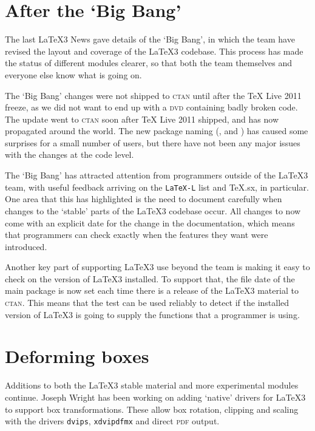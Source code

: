 \documentclass{ltnews}
\begin{document}
\maketitle

\section{After the `Big Bang'}

The last \LaTeX3 News gave details of the `Big Bang', in which the team have
revised the layout and coverage of the \LaTeX3 codebase. This process has
made the status of different modules clearer, so that both the team themselves
and everyone else know what is going on.

The `Big Bang' changes were not shipped to \textsc{ctan} until after the \TeX{}
Live 2011 freeze, as we did not want to end up with a \textsc{dvd} containing
badly broken code. The update went to \textsc{ctan} soon after \TeX{} Live 2011
shipped, and has now propagated around the world. The new package naming
(,  and ) has caused some
surprises for a small number of users, but there have not been any major
issues with the changes at the code level.

The `Big Bang' has attracted attention from programmers outside of the
\LaTeX3 team, with useful feedback arriving on the
\texttt{LaTeX-L} list and TeX.sx, in particular. One area that this has
highlighted is the need to document carefully when changes to the `stable'
parts of the \LaTeX3 codebase occur. All changes to  now
come with an explicit date for the change in the documentation, which means
that programmers can check exactly when the features they want were introduced.

Another key part of supporting \LaTeX3 use beyond the team is making it easy
to check on the version of \LaTeX3 installed. To support that, the file date
of the main  package is now set each time there is a release of the
\LaTeX3 material to \textsc{ctan}. This means that the \LaTeXe{}
 test can be used reliably to detect if the installed
version of \LaTeX3 is going to supply the functions that a programmer is
using.

\section{Deforming boxes}

Additions to both the \LaTeX3 stable material and more experimental modules
continue. Joseph Wright has been working on adding `native' drivers for
\LaTeX3 to support box transformations. These allow box rotation, clipping
and scaling with the drivers \texttt{dvips}, \texttt{xdvipdfmx} and direct
\textsc{pdf} output.
\end{document}
